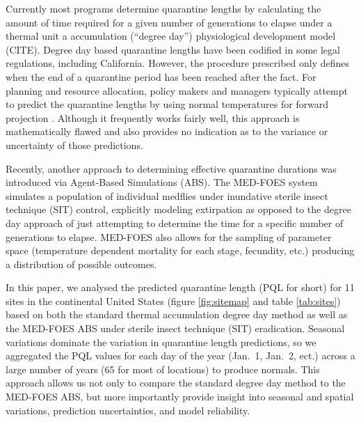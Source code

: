 \documentclass[10pt,a4paper,twocolumn]{article}
\begin{document}
Currently most programs determine quarantine lengths 
by calculating the amount of time required for a given number 
of generations to elapse under a thermal unit a accumulation (``degree day'')
physiological development model (CITE).
Degree day based quarantine lengths have been codified in some legal
regulations, including California\cite{3-CA-ADC-3406}.
However, the procedure prescribed only defines when the end of a
quarantine period has been reached after the fact.
For planning and resource allocation, policy makers and managers 
typically attempt to predict the quarantine lengths by using
normal temperatures for forward projection \cite{??}.
Although it frequently works fairly well,
this approach is mathematically flawed 
and also provides no indication as to the variance or uncertainty
of those predictions.

Recently, another approach to determining effective quarantine 
durations was introduced via Agent-Based Simulations (ABS)\cite{Manoukis2014}. 
The MED-FOES system simulates a population of individual medflies 
under inundative sterile insect technique (SIT) control, 
explicitly modeling extirpation as opposed to the degree day 
approach of just attempting to determine the time for a specific
number of generations to elapse.
MED-FOES also allows for the sampling of parameter space
(temperature dependent mortality for each stage, fecundity, etc.)
producing a distribution of possible outcomes.

In this paper, we analysed the predicted quarantine length (PQL for short) 
for 11 sites in the continental United States
(figure \ref{fig:sitemap} and table \ref{tab:sites})
based on both the standard thermal accumulation degree day method\cite{ECY:ECY1969503514} 
as well as the MED-FOES\cite{manoukis_computer_2014} ABS under sterile insect technique (SIT)\cite{??} eradication.
Seasonal variations dominate the variation in quarantine length predictions, 
so we aggregated the PQL values for each day of the year 
(Jan.\ 1, Jan.\ 2, ect.) 
across a large number of years (65 for most of locations) to produce normals.
This approach allows us not only to compare the standard degree day 
method to the MED-FOES ABS, but more importantly provide insight 
into seasonal and spatial variations, prediction uncertainties, 
and model reliability.
\end{document}
